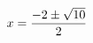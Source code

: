 \documentclass[preview]{standalone}
\begin{document}
\begin{align*}
\special{dvisvgm:raw <g id='unique000'>}x=\frac{-2\pm\sqrt{10}}{2}\special{dvisvgm:raw </g>}
\end{align*}
\end{document}

